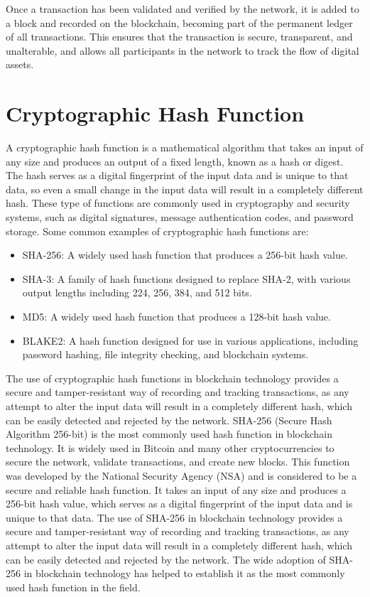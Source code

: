 \documentclass[target=mst,aauheader=]{thud}
\begin{document}
    Once a transaction has been validated and verified by the network, it is added to a block and recorded on the blockchain, becoming part of the permanent ledger of all transactions. This ensures that the transaction is secure, transparent, and unalterable, and allows all participants in the network to track the flow of digital assets.
    
    \section{Cryptographic Hash Function}
    
    A cryptographic hash function is a mathematical algorithm that takes an input of any size and produces an output of a fixed length, known as a hash or digest. The hash serves as a digital fingerprint of the input data and is unique to that data, so even a small change in the input data will result in a completely different hash. These type of functions are commonly used in cryptography and security systems, such as digital signatures, message authentication codes, and password storage.
    Some common examples of cryptographic hash functions are:
    
    \begin{itemize}    

        \item SHA-256: A widely used hash function that produces a 256-bit hash value.
        \item SHA-3: A family of hash functions designed to replace SHA-2, with various output lengths including 224, 256, 384, and 512 bits.
        \item MD5: A widely used hash function that produces a 128-bit hash value.
        \item BLAKE2: A hash function designed for use in various applications, including password hashing, file integrity checking, and blockchain systems.

    \end{itemize}

    The use of cryptographic hash functions in blockchain technology provides a secure and tamper-resistant way of recording and tracking transactions, as any attempt to alter the input data will result in a completely different hash, which can be easily detected and rejected by the network.
    SHA-256 (Secure Hash Algorithm 256-bit) is the most commonly used hash function in blockchain technology. It is widely used in Bitcoin and many other cryptocurrencies to secure the network, validate transactions, and create new blocks. This function was developed by the National Security Agency (NSA) and is considered to be a secure and reliable hash function. It takes an input of any size and produces a 256-bit hash value, which serves as a digital fingerprint of the input data and is unique to that data. The use of SHA-256 in blockchain technology provides a secure and tamper-resistant way of recording and tracking transactions, as any attempt to alter the input data will result in a completely different hash, which can be easily detected and rejected by the network. The wide adoption of SHA-256 in blockchain technology has helped to establish it as the most commonly used hash function in the field.
    
\end{document}

